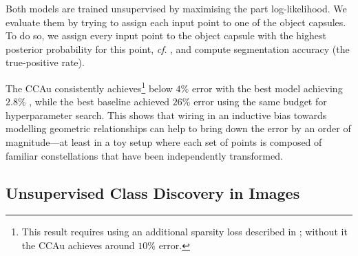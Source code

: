 Both models are trained unsupervised by maximising the part log-likelihood.
We evaluate them by trying to assign each input point to one of the object capsules.
To do so, we assign every input point to the object capsule with the highest posterior probability for this point, \textit{cf}. , and compute segmentation accuracy (\!\ie the true-positive rate).

The \gls{CCAu} consistently achieves\footnote{This result requires using an additional sparsity loss described in ; without it the \gls{CCAu} achieves around $10\%$ error.} below $4\%$ error with the best model achieving $2.8\%$
, while the best baseline achieved $26\%$ error using the same budget for hyperparameter search.
This shows that wiring in an inductive bias towards modelling geometric relationships can help to bring down the error by an order of magnitude—at least in a toy setup where each set of points is composed of familiar constellations that have been independently transformed.

\subsection{Unsupervised Class Discovery in Images}
\label{sec:cls_experiments}

